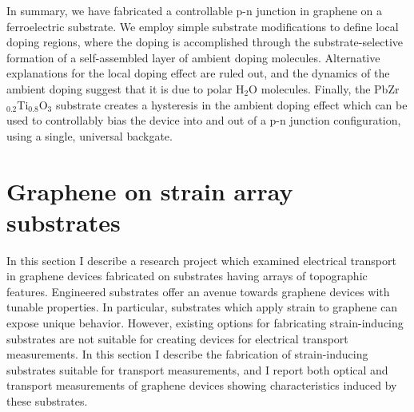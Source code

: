\documentclass[edeposit,fullpage,draftthesis]{uiucthesis2009}
\begin{document}
        In summary, we have fabricated a controllable p-n junction in graphene on a ferroelectric substrate. We employ simple substrate modifications to define local doping regions, where the doping is accomplished through the substrate-selective formation of a self-assembled layer of ambient doping molecules. Alternative explanations for the local doping effect are ruled out, and the dynamics of the ambient doping suggest that it is due to polar H$_2$O molecules. Finally, the PbZr$_{0.2}$Ti$_{0.8}$O$_3$ substrate creates a hysteresis in the ambient doping effect which can be used to controllably bias the device into and out of a p-n junction configuration, using a single, universal backgate.




\pagebreak
\section{Graphene on strain array substrates}
\label{sec:res:strain}

            
    In this section I describe a research project which examined electrical transport in graphene
    devices fabricated on substrates having arrays of topographic features.
    Engineered substrates offer an avenue towards graphene devices with tunable properties.
    In particular, substrates which apply strain to graphene can expose unique behavior.
    However, existing options for fabricating strain-inducing substrates are not suitable for creating 
    devices for electrical transport measurements.
    In this section I describe the fabrication of strain-inducing substrates suitable for transport measurements,
    and I report both optical and transport measurements of graphene devices showing characteristics induced by these substrates.
            
\end{document}
